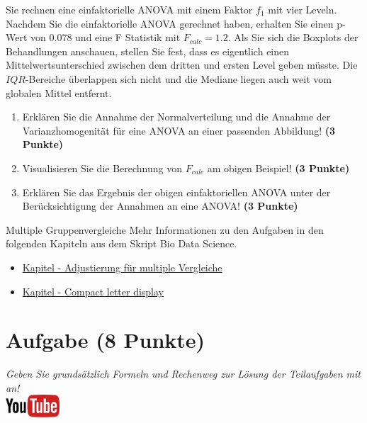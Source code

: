 \documentclass[a4paper, 9pt]{scrartcl}\usepackage[]{graphicx}\usepackage[]{xcolor}
\begin{document}
Sie rechnen eine einfaktorielle ANOVA mit einem Faktor $f_1$ mit
vier Leveln. Nachdem Sie die einfaktorielle ANOVA gerechnet
haben, erhalten Sie einen p-Wert von $0.078$ und eine F Statistik mit
$F_{calc} = 1.2$. Als Sie sich die Boxplots der Behandlungen anschauen,
stellen Sie fest, dass es eigentlich einen Mittelwertsunterschied zwischen
dem dritten und ersten Level geben m{\"u}sste. Die
$IQR$-Bereiche {\"u}berlappen sich nicht und die Mediane liegen auch weit vom
globalen Mittel entfernt.


\begin{enumerate}
\item Erkl{\"a}ren Sie die Annahme der Normalverteilung und die Annahme der
  Varianzhomogenit{\"a}t f{\"u}r eine ANOVA an einer passenden Abbildung! \textbf{(3 Punkte)}
\item Visualisieren Sie die Berechnung von $F_{calc}$ am obigen Beispiel!
  \textbf{(3 Punkte)}
\item Erkl{\"a}ren Sie das Ergebnis der obigen einfaktoriellen ANOVA unter der
  Ber{\"u}cksichtigung der Annahmen an eine ANOVA! \textbf{(3 Punkte)}
\end{enumerate}

 
\clearpage
\begin{graybox}{Multiple Gruppenvergleiche}
Mehr Informationen zu den Aufgaben in den folgenden Kapiteln aus dem Skript Bio Data Science.
  \begin{itemize}
  \item \href{https://jkruppa.github.io/stat-tests-theorie.html}{Kapitel - Adjustierung f{\"u}r multiple Vergleiche}
  \item \href{https://jkruppa.github.io/stat-tests-posthoc.html}{Kapitel - Compact letter display}
  \end{itemize}
\end{graybox}
\clearpage

\section{Aufgabe \hfill (8 Punkte)}

\textit{Geben Sie grunds{\"a}tzlich Formeln und Rechenweg zur L{\"o}sung der
  Teilaufgaben mit an!} \\[1Ex]

 \hfill\href{https://youtu.be/hr_jPd1hpKY}{\includegraphics[width =
   2cm]{img/youtube}}\\[1Ex]
\end{document}
